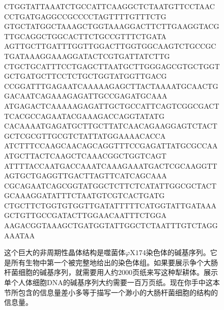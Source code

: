 \begin{figure}
\begin{dnaseq}
CTGGTATTAAATCTGCCATTCAAGGCTCTAATGTTCCTAACCCTGATGAGGCCGCCCCTAGTTTTGTTTCTG
GTGCTATGGCTAAAGCTGGTAAAGGACTTCTTGAAGGTACGTTGCAGGCTGGCACTTCTGCCGTTTCTGATA
AGTTGCTTGATTTGGTTGGACTTGGTGGCAAGTCTGCCGCTGATAAAGGAAAGGATACTCGTGATTATCTTG
CTGCTGCATTTCCTGAGCTTAATGCTTGGGAGCGTGCTGGTGCTGATGCTTCCTCTGCTGGTATGGTTGACG
CCGGATTTGAGAATCAAAAAGAGCTTACTAAAATGCAACTGGACAATCAGAAAGAGATTGCCGAGATGCAAA
ATGAGACTCAAAAAGAGATTGCTGCCATTCAGTCGGCGACTTCACGCCAGAATACGAAAGACCAGGTATATG
CACAAAATGAGATGCTTGCTTATCAACAGAAGGAGTCTACTGCTCGCGTTGCGTCTATTATGGAAAACACCA
ATCTTTCCAAGCAACAGCAGGTTTCCGAGATTATGCGCCAAATGCTTACTCAAGCTCAAACGGCTGGTCAGT
ATTTTACCAATGACCAAATCAAAGAAATGACTCGCAAGGTTAGTGCTGAGGTTGACTTAGTTCATCAGCAAA
CGCAGAATCAGCGGTATGGCTCTTCTCATATTGGCGCTACTGCAAAGGATATTTCTAATGTCGTCACTGATG
CTGCTTCTGGTGTGGTTGATATTTTTCATGGTATTGATAAAGCTGTTGCCGATACTTGGAACAATTTCTGGA
AAGACGGTAAAGCTGATGGTATTGGCTCTAATTTGTCTAGGAAATAA
\end{dnaseq}
\caption[噬菌体$\varphi\mathrm{X}174$染色体的碱基序列。]
  {这个巨大的非周期性晶体结构是噬菌体$\varphi\mathrm{X}174$染色体的碱基序列。它是所有生物中第一个被完整地给出的染色体组。如果要展示争个大肠杆菌细胞的碱基序列，就需要用人约$2000$页纸来写这种犁耕体。展示单个人体细胞DNA的碱基序列大约需要一百万页纸。现在你手中这本节所包含的信息量差小多等于描写一个渺小的大肠杆菌细胞的结构的信息量。}
\end{figure}
